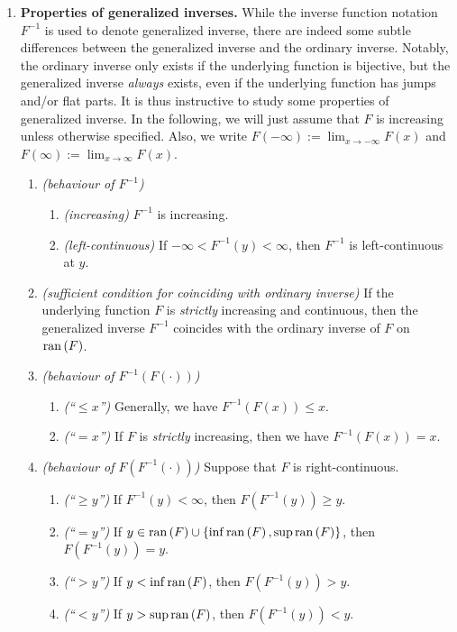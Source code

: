 \begin{enumerate}
\item \label{it:gen-inv-prop} \textbf{Properties of generalized inverses.}
While the inverse function notation \(F^{-1}\) is used to denote generalized
inverse, there are indeed some subtle differences between the generalized
inverse and the ordinary inverse. Notably, the ordinary inverse only exists if
the underlying function is bijective, but the generalized inverse \emph{always}
exists, even if the underlying function has jumps and/or flat parts. It is thus
instructive to study some properties of generalized inverse. In the following,
we will just assume that \(F\) is increasing unless otherwise specified. Also,
we write \(F(-\infty):=\lim_{x\to -\infty}F(x)\) and \(F(\infty):=\lim_{x\to
\infty}F(x)\).
\begin{enumerate}
\item \emph{(behaviour of \(F^{-1}\))}
\begin{enumerate}
\item \emph{(increasing)} \(F^{-1}\) is increasing.
\item \emph{(left-continuous)} If \(-\infty<F^{-1}(y)<\infty\), then \(F^{-1}\)
is left-continuous at \(y\).
\end{enumerate}
\item \emph{(sufficient condition for coinciding with ordinary inverse)} If the
underlying function \(F\) is \emph{strictly} increasing and continuous, then
the generalized inverse \(F^{-1}\) coincides with the ordinary inverse of
\(F\) on \(\operatorname{ran}\left(F\right)\).
\item \emph{(behaviour of \(F^{-1}(F(\cdot))\))}
\begin{enumerate}
\item \emph{(``\(\le x\)'')} Generally, we have \(F^{-1}(F(x))\le x\).
\item \emph{(``\(=x\)'')} If \(F\) is \emph{strictly} increasing, then we have \(F^{-1}(F(x))=x\).
\end{enumerate}
\item \emph{(behaviour of \(F(F^{-1}(\cdot))\))} Suppose that \(F\) is
right-continuous.
\begin{enumerate}
\item \emph{(``\(\ge y\)'')} If \(F^{-1}(y)<\infty\), then \(F(F^{-1}(y))\ge y\).
\item \emph{(``\(= y\)'')} If \(y\in\operatorname{ran}\left(F\right)\cup\{\inf\operatorname{ran}\left(F\right),\sup\operatorname{ran}\left(F\right)\}\), then \(F(F^{-1}(y))=y\).
\item \emph{(``\(> y\)'')} If \(y<\inf\operatorname{ran}\left(F\right)\), then \(F(F^{-1}(y))>y\).
\item \emph{(``\(< y\)'')} If \(y>\sup\operatorname{ran}\left(F\right)\), then \(F(F^{-1}(y))<y\).

\end{enumerate}
\end{enumerate}
\end{enumerate}
